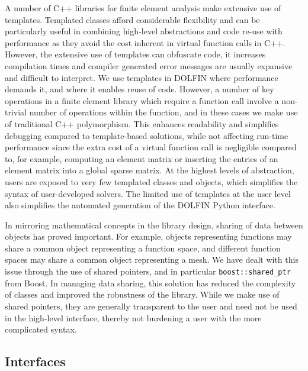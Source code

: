 \documentclass[acmtoms]{acmtrans2m}
\newcommand{\emp}[1]{\texttt{#1}}
\newcommand{\dolfin}{DOLFIN}
\begin{document}
A number of C++ libraries for finite element analysis make extensive
use of templates. Templated classes afford considerable flexibility
and can be particularly useful in combining high-level abstractions
and code re-use with performance as they avoid the cost inherent in
virtual function calls in C++. However, the extensive use of templates
can obfuscate code, it increases compilation times and
compiler generated error messages are usually expansive and difficult
to interpret. We use templates in \dolfin{} where
performance demands it, and where it enables reuse of code.
However, a number of key operations in a finite element library
which require a function call involve a non-trivial number of operations
within the function, and in these cases we make use of traditional C++
polymorphism. This enhances readability and simplifies debugging
compared to template-based solutions, while not affecting run-time
performance since the extra cost of a virtual function call is
negligible compared to, for example, computing an element matrix or
inserting the entries of an element matrix into a global sparse matrix.
At the highest levels of abstraction, users are exposed to
very few templated classes and objects, which simplifies the syntax of
user-developed solvers. The limited use of templates at the user level
also simplifies the automated generation of the \dolfin{} Python
interface.

In mirroring mathematical concepts in the library design, sharing of
data between objects has proved important. For example, objects
representing functions may share a common object representing a
function space, and different function spaces may share a common
object representing a mesh. We have dealt with this issue through the
use of shared pointers, and in particular
\emp{boost::shared\_ptr} from Boost. In managing data sharing, this
solution has reduced the complexity of classes and improved the
robustness of the library.  While we make use of shared
pointers, they are generally transparent to the user and need not be
used in the high-level interface, thereby not burdening a user with
the more complicated syntax.

\subsection{Interfaces}
\label{sec:interfaces}
\end{document}
